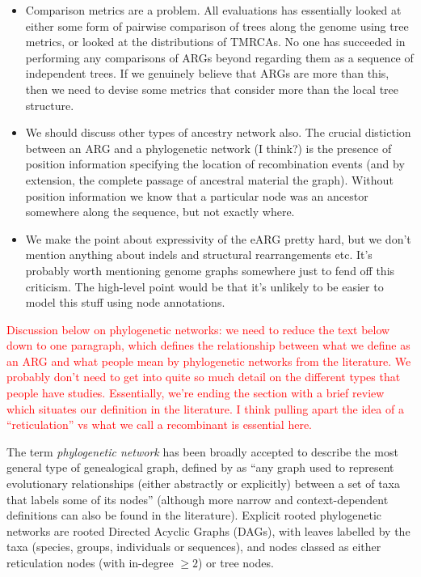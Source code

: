 \documentclass{article}
\begin{document}
\begin{itemize}
\item Comparison metrics are a problem. All evaluations has essentially
looked at either some form of pairwise comparison of trees along the genome
using tree metrics, or looked at the distributions of TMRCAs. No
one has succeeded in performing any comparisons of ARGs beyond
regarding them as a sequence of independent trees. If we genuinely believe
that ARGs are more than this, then we need to devise some metrics that
consider more than the local tree structure.

\item We should discuss other types of ancestry network also.
The crucial distiction between an ARG and a phylogenetic network (I think?) is
the presence of position information specifying the location of
recombination events (and by extension, the complete passage
of ancestral material the graph). Without position information
we know that a particular node was an ancestor somewhere along the
sequence, but not exactly where.

\item We make the point about expressivity of the eARG pretty
hard, but we don't mention anything about indels and structural
rearrangements etc. It's probably worth mentioning genome graphs
somewhere just to fend off this criticism. The high-level point
would be that it's unlikely to be easier to model this stuff
using node annotations.

\end{itemize}

\textcolor{red}{Discussion below on phylogenetic networks: we need to
reduce the text below down to one paragraph, which
defines the relationship between what we define as an ARG and
what people mean by phylogenetic networks from the literature.
We probably don't need to get into quite so much detail on
the different types that people have studies. Essentially,
we're ending the section with a brief review which situates
our definition in the literature. I think pulling apart the
idea of a ``reticulation'' vs what we call a recombinant
is essential here.}

The term \emph{phylogenetic network} has been broadly accepted to describe the most general
type of genealogical graph, defined by \citet{huson2010phylogenetic} as ``any graph used to
represent evolutionary relationships (either abstractly or explicitly) between a set of taxa
that labels some of its nodes'' (although more narrow and context-dependent definitions can also
be found in the literature). Explicit rooted phylogenetic networks are rooted Directed Acyclic Graphs (DAGs),
with leaves labelled by the taxa (species, groups, individuals or sequences), and nodes classed
as either reticulation nodes (with in-degree $\geq 2$) or tree nodes.
\end{document}
